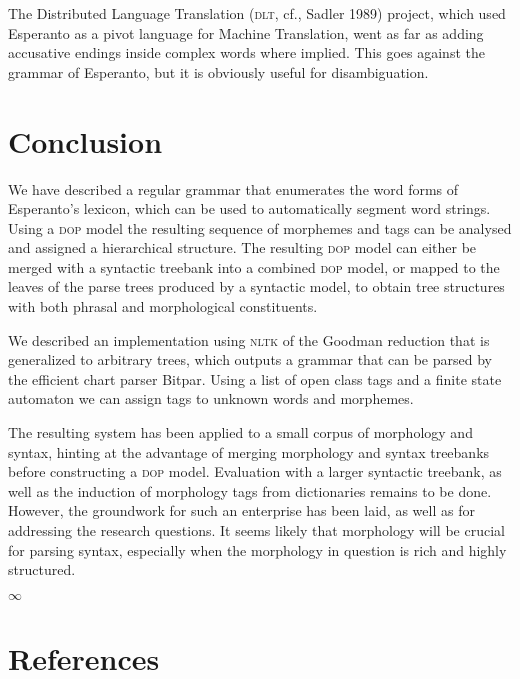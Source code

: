 \documentclass[10pt,a4paper]{article}
\begin{document}
The Distributed Language Translation (\textsc{dlt}, cf., Sadler 1989) project,
which used Esperanto as a pivot language for Machine Translation, went as far
as adding accusative endings inside complex words where implied. This goes
against the grammar of Esperanto, but it is obviously useful for
disambiguation.

\section{Conclusion}

We have described a regular grammar that enumerates the word forms of
Esperanto's lexicon, which can be used to automatically segment word strings.
Using a \textsc{dop} model the resulting sequence of morphemes and tags can be analysed
and assigned a hierarchical structure. The resulting \textsc{dop} model can either be
merged with a syntactic treebank into a combined \textsc{dop} model, or mapped to the
leaves of the parse trees produced by a syntactic model, to obtain tree
structures with both phrasal and morphological constituents.

We described an implementation using \textsc{nltk} of the Goodman reduction that is
generalized to arbitrary trees, which outputs a grammar that can be parsed by
the efficient chart parser Bitpar. Using a list of open class tags and a
finite state automaton we can assign tags to unknown words and
morphemes.

The resulting system has been applied to a small corpus of morphology and
syntax, hinting at the advantage of merging morphology and syntax treebanks
before constructing a \textsc{dop} model. Evaluation with a larger syntactic treebank,
as well as the induction of morphology tags from dictionaries remains to be
done. However, the groundwork for such an enterprise has been laid, as well as
for addressing the research questions. It seems likely that morphology
will be crucial for parsing syntax, especially when the morphology in question
is rich and highly structured.

\begin{center}
$\infty$
\end{center}


\section{References}
\end{document}
